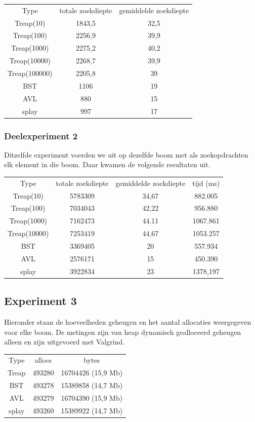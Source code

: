 \documentclass[a4paper,10pt]{article}
\begin{document}
\begin{center}
\begin{tabular}{c c c}
Type & totale zoekdiepte & gemiddelde zoekdiepte \\
Treap(10) & 1843,5 & 32,5 \\
Treap(100) & 2256,9 & 39,9 \\
Treap(1000) & 2275,2 & 40,2 \\
Treap(10000) & 2268,7 & 39,9 \\
Treap(100000) & 2205,8 & 39 \\
BST & 1106 & 19 \\
AVL & 880 & 15 \\
splay & 997 & 17 \\
\end{tabular}
\end{center}

\subsubsection{Deelexperiment 2}
Ditzelfde experiment voerden we uit op dezelfde boom met als zoekopdrachten elk element in die boom. Daar kwamen de volgende resultaten uit. \\

\begin{center}
\begin{tabular}{c c c c}
Type & totale zoekdiepte & gemiddelde zoekdiepte & tijd (ms) \\
Treap(10) & 5783309 & 34,67 & 882.005 \\
Treap(100) & 7034043 & 42,22 & 956.880 \\
Treap(1000) & 7162473 & 44.11 & 1067.861 \\
Treap(10000) & 7253419 & 44,67 & 1053.257 \\
BST & 3369405 & 20 & 557.934 \\
AVL & 2576171 & 15 & 450.390 \\
splay & 3922834 & 23 & 1378,197  \\
\end{tabular}
\end{center}

\subsection{Experiment 3}
Hieronder staan de hoeveelheden geheugen en het aantal allocaties weergegeven voor elke boom. De metingen zijn van heap dynamisch gealloceerd geheugen alleen en zijn uitgevoerd met Valgrind. \\
\begin{center}
\begin{tabular}{c c c}
Type & allocs & bytes \\
Treap & 493280 & 16704426 (15,9 Mb) \\
BST & 493278 & 15389858 (14,7 Mb) \\
AVL & 493279 & 16704390 (15,9 Mb)\\
splay & 493260 & 15389922 (14,7 Mb)\\
\end{tabular}
\end{center}
\end{document}
